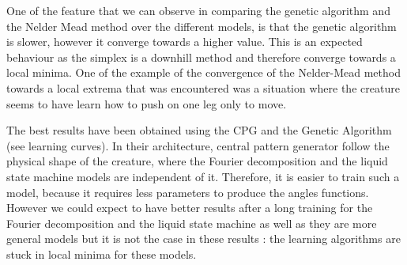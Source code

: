 One of the feature that we can observe in comparing the genetic algorithm and the Nelder Mead method over the different models, is that the genetic algorithm is slower, however it converge towards a higher value. This is an expected behaviour as the simplex is a downhill method and therefore converge towards a local minima. One of the example of the convergence of the Nelder-Mead method towards a local extrema that was encountered was a situation where the creature seems to have learn how to push on one leg only to move. 

The best results have been obtained using the CPG and the Genetic Algorithm (see learning curves). In their architecture, central pattern generator follow the physical shape of the creature, where the Fourier decomposition and the liquid state machine models are independent of it. Therefore, it is easier to train such a model, because it requires less parameters to produce the angles functions. However we could expect to have better results after a long training for the Fourier decomposition and the liquid state machine as well as they are more general models but it is not the case in these results : the learning algorithms are stuck in local minima for these models.




